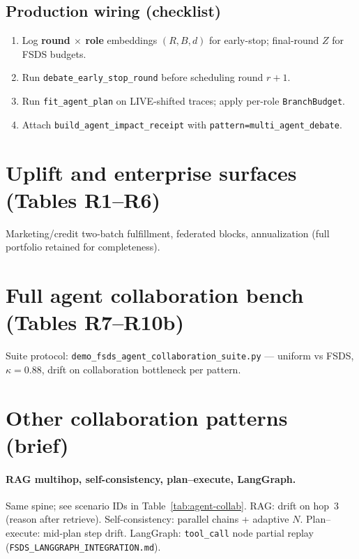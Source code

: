 \documentclass[11pt]{article}
\begin{document}
\subsection{Production wiring (checklist)}
\begin{enumerate}
  \item Log \textbf{round $\times$ role} embeddings $(R,B,d)$ for early-stop; final-round $Z$ for FSDS budgets.
  \item Run \texttt{debate\_early\_stop\_round} before scheduling round $r{+}1$.
  \item Run \texttt{fit\_agent\_plan} on LIVE-shifted traces; apply per-role \texttt{BranchBudget}.
  \item Attach \texttt{build\_agent\_impact\_receipt} with \texttt{pattern=multi\_agent\_debate}.
\end{enumerate}

\section{Uplift and enterprise surfaces (Tables R1--R6)}

Marketing/credit two-batch fulfillment, federated blocks, annualization (full portfolio retained for completeness).



\section{Full agent collaboration bench (Tables R7--R10b)}

Suite protocol: \texttt{demo\_fsds\_agent\_collaboration\_suite.py} --- uniform vs FSDS, $\kappa{=}0.88$, drift on collaboration bottleneck per pattern.



\section{Other collaboration patterns (brief)}

\paragraph{RAG multihop, self-consistency, plan--execute, LangGraph.}
Same spine; see scenario IDs in Table~\ref{tab:agent-collab}.
RAG: drift on hop~3 (reason after retrieve).
Self-consistency: parallel chains + adaptive $N$.
Plan--execute: mid-plan step drift.
LangGraph: \texttt{tool\_call} node partial replay (\texttt{FSDS\_LANGGRAPH\_INTEGRATION.md}).
\end{document}
